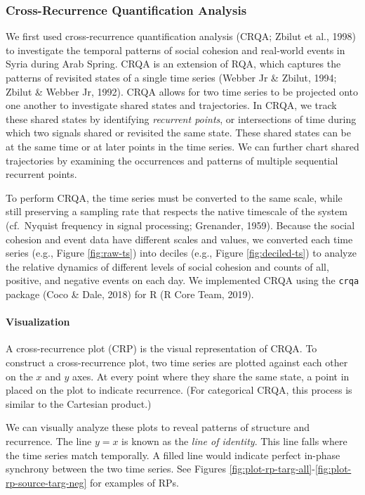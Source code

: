 \documentclass[
  english,
  man]{apa6}
\let\oldparagraph\paragraph
\renewcommand{\paragraph}[1]{\oldparagraph{#1}\mbox{}}
\begin{document}
\hypertarget{cross-recurrence-quantification-analysis}{%
\subsubsection{Cross-Recurrence Quantification Analysis}\label{cross-recurrence-quantification-analysis}}

We first used cross-recurrence quantification analysis (CRQA; Zbilut et al., 1998) to investigate the temporal patterns of social cohesion
and real-world events in Syria during Arab Spring. CRQA is an extension of RQA,
which captures the patterns of revisited states of a single time series
(Webber Jr \& Zbilut, 1994; Zbilut \& Webber Jr, 1992). CRQA allows for two time series
to be projected onto one another to investigate shared states and trajectories.
In CRQA, we track these shared states by identifying \emph{recurrent points}, or
intersections of time during which two signals shared or revisited the same
state. These shared states can be at the same time or at later points in the
time series. We can further chart shared trajectories by examining the
occurrences and patterns of multiple sequential recurrent points.

To perform CRQA, the time series must be converted to the same scale, while
still preserving a sampling rate that respects the native timescale of the
system (cf.~Nyquist frequency in signal processing; Grenander, 1959).
Because the social cohesion and event data have different scales and values, we
converted each time series (e.g., Figure \ref{fig:raw-ts}) into deciles (e.g.,
Figure \ref{fig:deciled-ts}) to analyze the relative dynamics of different
levels of social cohesion and counts of all, positive, and negative events on
each day. We implemented CRQA using the \texttt{crqa} package (Coco \& Dale, 2018) for R
(R Core Team, 2019).

\hypertarget{visualization}{%
\paragraph{Visualization}\label{visualization}}

A cross-recurrence plot (CRP) is the visual representation of CRQA. To construct
a cross-recurrence plot, two time series are plotted against each other on the
\(x\) and \(y\) axes. At every point where they share the same state, a point in
placed on the plot to indicate recurrence. (For categorical CRQA, this process
is similar to the Cartesian product.)

We can visually analyze these plots to reveal patterns of structure and
recurrence. The line \(y = x\) is known as the \emph{line of identity}. This line falls
where the time series match temporally. A filled line would indicate perfect
in-phase synchrony between the two time series. See Figures
\ref{fig:plot-rp-targ-all}-\ref{fig:plot-rp-source-targ-neg} for examples of
RPs.
\end{document}
